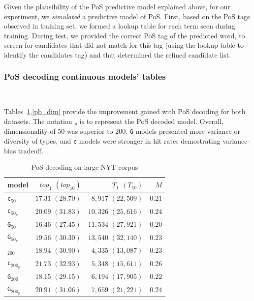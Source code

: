\documentclass[11pt,a4paper]{article}
\begin{document}
Given the plausibility of the PoS predictive model explained above, for our experiment, we \textit{simulated} a predictive model of PoS. First, based on the PoS tags observed in training set, we formed a lookup table for each term seen during training. During test, we provided the correct PoS tag of the predicted word, to screen for candidates that did not match for this tag (using the lookup table to identify the candidates tag) and that determined the refined candidate list.

\subsubsection{PoS decoding continuous models' tables}~\label{pos_apx}

Tables~\ref{nyt_dim},\ref{pb_dim} provide the improvement gained with PoS decoding for both datasets. The notation $_p$ is to represent the PoS decoded model. Overall, dimensionality of $50$ was superior to $200$. {\tt G} models presented more variance or diversity of types, and {\tt c} models were stronger in hit rates demostrating variance-bias tradeoff.

\begin{table}[h]
\begin{center}
\begin{tabular}{lrrr}
model &  $top_{1}$ $(top_{10})$ & $T_{1}$ $(T_{10})$ & $M$ \\ \hline
{\tt c}$_{50}$ & $17.31$ $(28.70)$ & $8,917$ $(22,509)$&  $0.21$  \\
{\tt c}$_{50_{p}}$ & $20.09$ $(31.83)$ & $10,326$ $(25,616)$ & $0.24$   \\
{\tt G}$_{50}$ & $16.46$ $(27.45)$ & $11,534$ $(27,921)$ & $0.20$   \\
{\tt G}$_{50_{p}}$ & $19.56$ $(30.30)$ & $13,540$ $(32,140)$ & $0.23$  \\
\addlinespace[1ex]
{\tt c}$_{200}$ & $18.94$ $(30.90)$ & $4,335$ $(13,087)$ & $0.23$  \\
{\tt c}$_{200_{p}}$ & $21.73$ $(32.93)$  & $5,348$ $(15,611)$ & $0.26$  \\
{\tt G}$_{200}$ & $18.15$ $(29.15)$ &  $6,194$ $(17,905)$ & $0.22$  \\
{\tt G}$_{200_{p}}$ & $20.91$ $(31.06)$ & $7,659$ $(21,221)$ & $0.24$  \\
\end{tabular}
\end{center}
\vspace{-0.1in}
\caption{\label{nyt_dim} PoS decoding on large NYT corpus}
\end{table}
\end{document}
